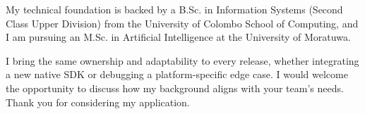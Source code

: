 \documentclass[11pt]{article}
\begin{document}
My technical foundation is backed by a B.Sc. in Information Systems (Second Class Upper Division) from the University of Colombo School of Computing, and I am pursuing an M.Sc. in Artificial Intelligence at the University of Moratuwa.

I bring the same ownership and adaptability to every release, whether integrating a new native SDK or debugging a platform-specific edge case. I would welcome the opportunity to discuss how my background aligns with your team's needs. Thank you for considering my application.

\end{document}
